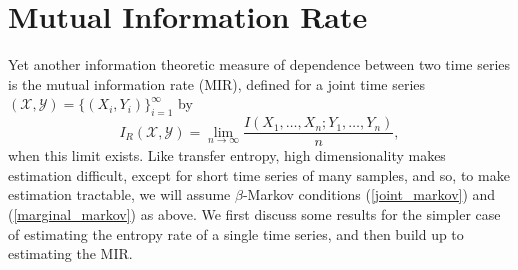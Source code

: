 \documentclass{article} %
\newcommand{\X}{\mathcal{X}}                        %
\newcommand{\Y}{\mathcal{Y}}                        %
\begin{document}

\section{Mutual Information Rate}
\label{sec:MIR}
Yet another information theoretic measure of dependence between two time series
is the mutual information rate (MIR), defined for a joint time series
$(\X,\Y) = \{(X_i,Y_i)\}_{i = 1}^\infty$ by
\[I_R(\X,\Y)= \lim_{n \to \infty} \frac{I(X_1,\dots,X_n;Y_1,\dots,Y_n)}{n},\]
when this limit exists. Like transfer entropy, high dimensionality makes
estimation difficult, except for short time series of many samples, and so, to
make estimation tractable, we will assume $\beta$-Markov conditions
(\ref{joint_markov}) and (\ref{marginal_markov}) as above. We first discuss
some results for the simpler case of estimating the entropy rate of a single
time series, and then build up to estimating the MIR.
\end{document}
